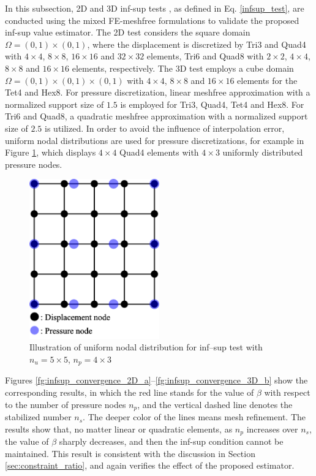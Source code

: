 In this subsection, 2D and 3D inf-sup tests \cite{chapelle1993}, as defined in Eq. \ref{infsup_test}, are conducted using the mixed FE-meshfree formulations to validate the proposed inf-sup value estimator.
The 2D test considers the square domain $\Omega = (0,1)\times (0,1)$, where the displacement is discretized by Tri3 and Quad4 with $4\times 4$, $8\times 8$, $16\times 16$ and $32\times 32$ elements, Tri6 and Quad8 with $2\times 2$, $4\times 4$, $8\times 8$ and $16\times 16$ elements, respectively. The 3D test employs a cube domain $\Omega = (0,1)\times (0,1)\times (0,1)$ with $4\times 4$, $8\times 8$ and $16\times 16$ elements for the Tet4 and Hex8.
For pressure discretization, linear meshfree approximation with a normalized support size of $1.5$ is employed for Tri3, Quad4, Tet4 and Hex8.
For Tri6 and Quad8, a quadratic meshfree approximation with a normalized support size of $2.5$ is utilized.
In order to avoid the influence of interpolation error, uniform nodal distributions are used for pressure discretizations, for example in Figure \ref{fg:infsup_mesh}, which displays $4\times4$ Quad4 elements with $4\times3$ uniformly distributed pressure nodes.

\begin{figure}[H]
\centering
\includegraphics[width=0.5\textwidth]{infsup_mesh.png}
\caption{Illustration of uniform nodal distribution for inf--sup test with $n_u=5\times5$, $n_p=4\times3$}\label{fg:infsup_mesh}
\end{figure}

Figures \ref{fg:infsup_convergence_2D_a}--\ref{fg:infsup_convergence_3D_b} show the corresponding results, in which the red line stands for the value of $\beta$ with respect to the number of pressure nodes $n_p$, and the vertical dashed line denotes the stabilized number $n_s$. The deeper color of the lines means mesh refinement. The results show that, no matter linear or quadratic elements, as $n_p$ increases over $n_s$, the value of $\beta$ sharply decreases, and then the inf-sup condition cannot be maintained. This result is consistent with the discussion in Section \ref{sec:constraint_ratio}, and again verifies the effect of the proposed estimator.

